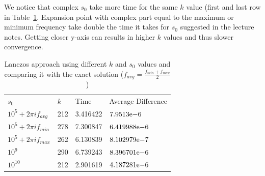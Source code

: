 We notice that complex $s_{0}$ take more time for the same $k$ value (first and last row in Table~\ref{tab:s0}. Expansion point with complex part equal to the maximum or minimum frequency take double the time it takes for $s_{0}$ suggested in the lecture notes. Getting closer y-axis can results in higher $k$ values and thus slower convergence. 


\begin{table}[!tbh]
 \centering    
\begin{tabular}{ ||p{3.0cm}|p{1.5cm}| p{4cm}| p{4cm}||}
\hline
 $s_{0}$  & $k$ & Time & Average Difference \\ \hhline{|=|=|=|=|}   
 $10^{5} + 2 \pi i f_{avg}$  & 212 & 3.416422 & ${7.9513}\mathrm{e}{-6}$\\
 $10^{5} + 2 \pi i f_{min}$ & 278 & 7.300847 & ${6.419988}\mathrm{e}{-6}$\\
 $10^{5} + 2 \pi i f_{max}$ & 262 & 6.130839 & ${8.102979}\mathrm{e}{-7}$ \\
 $10^{9} $                  & 290 & 6.739243 & ${8.396701}\mathrm{e}{-6}$ \\
 $10^{10}$                  & 212 & 2.901619 & ${4.187281}\mathrm{e}{-6}$  \\  
\hline
\end{tabular} 
\caption{Lanczos approach using different $k$ and $s_{0}$ values and comparing it with the exact solution ($f_{avg} = \frac{f_{min}+f_{max}}{2}$) }
   \label{tab:s0}
\end{table}